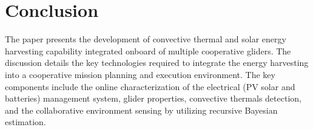 \documentclass{ifacconf}
\newcommand{\squeezeup}{\vspace{-3.0mm}}
\begin{document}
\section{Conclusion}
\squeezeup
The paper presents the development of convective thermal and solar energy
harvesting capability integrated onboard of multiple cooperative gliders. The
discussion details the key technologies required to integrate the energy
harvesting into a cooperative mission planning and execution environment. The
key components include the online characterization of the electrical (PV
solar and batteries) management system, glider properties, convective
thermals detection, and the collaborative environment sensing by utilizing
recursive Bayesian estimation.




\end{document}
